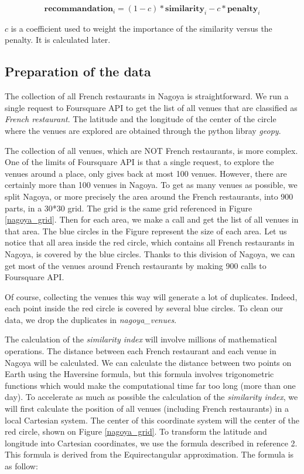 \documentclass[12pt,a4paper]{article}
\begin{document}
\begin{equation}
	\textbf{recommandation}_{i} = (1 - c) * \textbf{similarity}_{i} - c * \textbf{penalty}_{i}
\end{equation}

$c$ is a coefficient used to weight the importance of the similarity versus the penalty. It is calculated later.

\subsection{Preparation of the data}

The collection of all French restaurants in Nagoya is straightforward. We run a single request to Foursquare API to get the list of all venues that are classified as \textit{French restaurant}. The latitude and the longitude of the center of the circle where the venues are explored are obtained through the python libray \textit{geopy}.

\medskip

The collection of all venues, which are NOT French restaurants, is more complex. One of the limits of Foursquare API is that a single request, to explore the venues around a place, only gives back at most 100 venues. However, there are certainly more than 100 venues in Nagoya. To get as many venues as possible, we split Nagoya, or more precisely the area around the French restaurants, into 900 parts, in a 30*30 grid. The grid is the same grid referenced in Figure \ref{nagoya_grid}. Then for each area, we make a call and get the list of all venues in that area. The blue circles in the Figure represent the size of each area. Let us notice that all area inside the red circle, which contains all French restaurants in Nagoya, is covered by the blue circles. Thanks to this division of Nagoya, we can get most of the venues around French restaurants by making 900 calls to Foursquare API.

\medskip

Of course, collecting the venues this way will generate a lot of duplicates. Indeed, each point inside the red circle is covered by several blue circles. To clean our data, we drop the duplicates in \textit{nagoya\_venues}.

\medskip

The calculation of the \textit{similarity index} will involve millions of mathematical operations. The distance between each French restaurant and each venue in Nagoya will be calculated. We can calculate the distance between two points on Earth using the Haversine formula, but this formula involves trigonometric functions which would make the computational time far too long (more than one day). To accelerate as much as possible the calculation of the \textit{similarity index}, we will first calculate the position of all venues (including French restaurants) in a local Cartesian system. The center of this coordinate system will the center of the red circle, shown on Figure \ref{nagoya_grid}. To transform the latitude and longitude into Cartesian coordinates, we use the formula described in reference 2. This formula is derived from the Equirectangular approximation. The formula is as follow:
\end{document}

